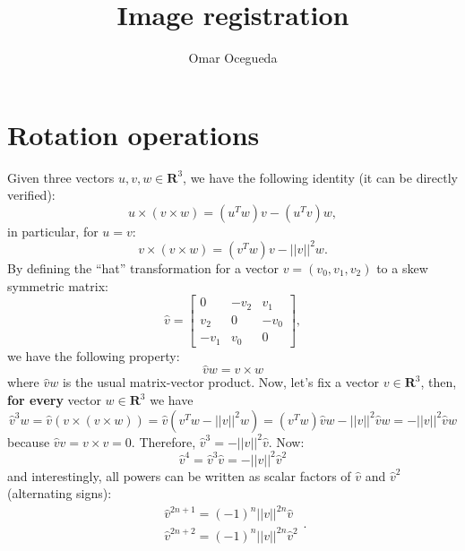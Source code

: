 \documentclass[11pt]{article}
\title{\textbf{Image registration}}
\date{}
\author{Omar Ocegueda}
\begin{document}
\maketitle
\section{Rotation operations}
Given three vectors $u,v,w \in \mathbf{R}^3$, we have the following identity (it can be directly verified):
\begin{equation}
    u\times(v \times w) = (u^T w)v - (u^T v)w,
\end{equation}
in particular, for $u=v$:
\begin{equation}
    v\times(v \times w) = (v^T w)v - ||v||^2w.
\end{equation}
By defining the ``hat'' transformation for a vector $v=(v_0, v_1, v_2)$ to a skew symmetric matrix:
\begin{equation}
    \hat{v} = \left[\begin{array}{ccc}
        0 & -v_2 & v_1 \\
        v_2 & 0 & -v_0 \\
        -v_1 & v_0 & 0
    \end{array}\right],
\end{equation}
we have the following property:
\begin{equation}
    \hat{v}w = v \times w
\end{equation}
where $\hat{v}w$ is the usual matrix-vector product. Now, let's fix a vector $v\in \mathbf{R}^{3}$, then, \textbf{for every} vector $w\in \mathbf{R}^{3}$ we have
\begin{equation}
    \hat{v}^{3}w = \hat{v}(v\times (v \times w)) = \hat{v}(v^T w - ||v||^2 w) = (v^T w)\hat{v}w - ||v||^{2}\hat{v}w = - ||v||^{2}\hat{v}w
\end{equation}
because $\hat{v}v=v \times v = 0$. Therefore, $\hat{v}^{3} = -||v||^{2}\hat{v}$. Now:
\begin{equation}
    \hat{v}^{4} = \hat{v}^{3}\hat{v} = -||v||^{2}\hat{v}^{2}
\end{equation}
and interestingly, all powers can be written as scalar factors of $\hat{v}$ and $\hat{v}^{2}$ (alternating signs):
\begin{equation}
    \begin{array}{l}
        \hat{v}^{2n+1} = (-1)^{n}||v||^{2n}\hat{v}\\
        \hat{v}^{2n+2} = (-1)^{n}||v||^{2n}\hat{v}^{2}
    \end{array}.
\end{equation}
\end{document}
